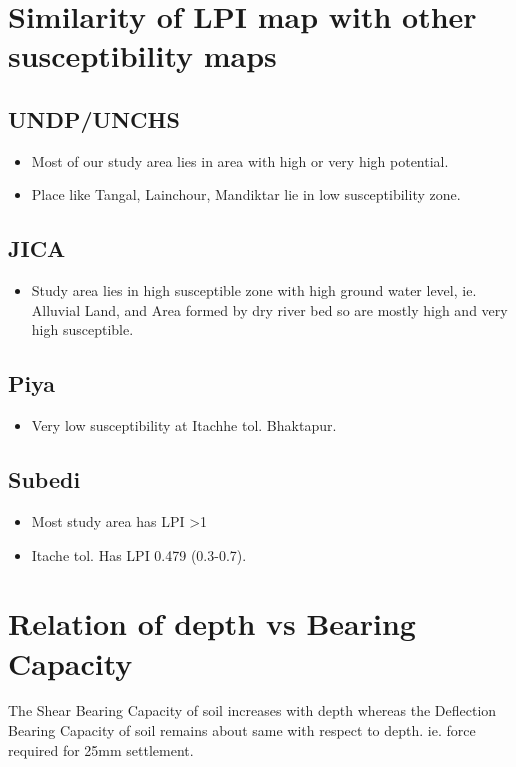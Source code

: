 \section{Similarity of LPI map with other susceptibility maps}
\subsection{UNDP/UNCHS}
\begin{itemize}
\item Most of our study area lies in area with high or very high potential.
\item Place like Tangal, Lainchour, Mandiktar lie in low susceptibility zone.
\end{itemize}

\subsection{JICA}
\begin{itemize}
\item Study area lies in high susceptible zone with high ground water level, ie. Alluvial Land, and Area formed by dry river bed so are mostly high and very high susceptible.
\end{itemize}

\subsection{Piya}
\begin{itemize}
\item Very low susceptibility at Itachhe tol. Bhaktapur.
\end{itemize}

\subsection{Subedi}
\begin{itemize}
\item Most study area has LPI \textgreater 1
\item Itache tol. Has LPI 0.479 (0.3-0.7).
\end{itemize}

\section{Relation of depth vs Bearing Capacity}
The Shear Bearing Capacity of soil increases with depth whereas the Deflection Bearing Capacity of soil remains about same with respect to depth. ie. force required for 25mm settlement.

